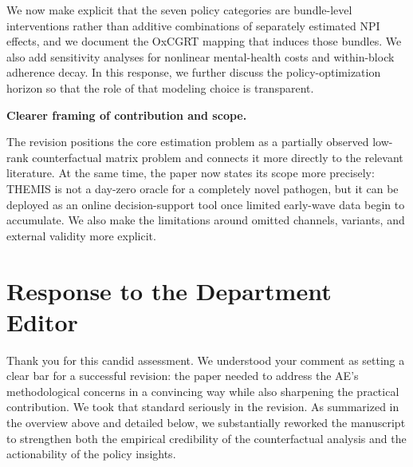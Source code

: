 \documentclass[letterpaper,twoside,11pt]{reviewresponse}
\begin{document}
We now make explicit that the seven policy categories are bundle-level interventions rather than additive combinations of separately estimated NPI effects, and we document the OxCGRT mapping that induces those bundles. We also add sensitivity analyses for nonlinear mental-health costs and within-block adherence decay. In this response, we further discuss the policy-optimization horizon so that the role of that modeling choice is transparent.

\noindent\textbf{Clearer framing of contribution and scope.}

The revision positions the core estimation problem as a partially observed low-rank counterfactual matrix problem and connects it more directly to the relevant literature. At the same time, the paper now states its scope more precisely: THEMIS is not a day-zero oracle for a completely novel pathogen, but it can be deployed as an online decision-support tool once limited early-wave data begin to accumulate. We also make the limitations around omitted channels, variants, and external validity more explicit.

\newpage

\section*{Response to the Department Editor}


Thank you for this candid assessment. We understood your comment as setting a clear bar for a successful revision: the paper needed to address the AE's methodological concerns in a convincing way while also sharpening the practical contribution. We took that standard seriously in the revision. As summarized in the overview above and detailed below, we substantially reworked the manuscript to strengthen both the empirical credibility of the counterfactual analysis and the actionability of the policy insights.
\end{document}
